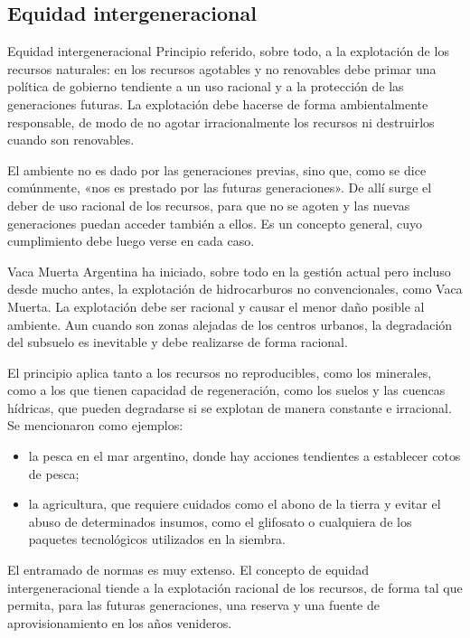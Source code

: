 \documentclass[12pt,oneside]{book}
\begin{document}
\subsection{Equidad intergeneracional}

\begin{definition}{Equidad intergeneracional}
Principio referido, sobre todo, a la explotación de los recursos naturales: en los recursos agotables y no renovables debe primar una política de gobierno tendiente a un uso racional y a la protección de las generaciones futuras. La explotación debe hacerse de forma ambientalmente responsable, de modo de no agotar irracionalmente los recursos ni destruirlos cuando son renovables.
\end{definition}

El ambiente no es dado por las generaciones previas, sino que, como se dice comúnmente, «nos es prestado por las futuras generaciones». De allí surge el deber de uso racional de los recursos, para que no se agoten y las nuevas generaciones puedan acceder también a ellos. Es un concepto general, cuyo cumplimiento debe luego verse en cada caso.

\begin{example}{Vaca Muerta}
Argentina ha iniciado, sobre todo en la gestión actual pero incluso desde mucho antes, la explotación de hidrocarburos no convencionales, como Vaca Muerta. La explotación debe ser racional y causar el menor daño posible al ambiente. Aun cuando son zonas alejadas de los centros urbanos, la degradación del subsuelo es inevitable y debe realizarse de forma racional.
\end{example}

El principio aplica tanto a los recursos no reproducibles, como los minerales, como a los que tienen capacidad de regeneración, como los suelos y las cuencas hídricas, que pueden degradarse si se explotan de manera constante e irracional. Se mencionaron como ejemplos:
\begin{itemize}
    \item la pesca en el mar argentino, donde hay acciones tendientes a establecer cotos de pesca;
    \item la agricultura, que requiere cuidados como el abono de la tierra y evitar el abuso de determinados insumos, como el glifosato o cualquiera de los paquetes tecnológicos utilizados en la siembra.
\end{itemize}
El entramado de normas es muy extenso. El concepto de equidad intergeneracional tiende a la explotación racional de los recursos, de forma tal que permita, para las futuras generaciones, una reserva y una fuente de aprovisionamiento en los años venideros.
\end{document}
